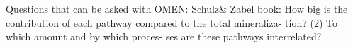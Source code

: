 \documentclass[gmd, manuscript]{copernicus}
\begin{document}




Questions that can be asked with OMEN: Schulz\& Zabel book: How big is the contribution of
each pathway compared to the total mineraliza-
tion? (2) To which amount and by which proces-
ses are these pathways interrelated?

\end{document}
